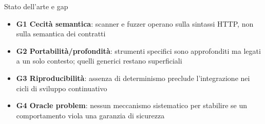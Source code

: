 
\begin{frame}{Stato dell'arte e gap}
  \begin{itemize}
    \item \textbf{G1 Cecità semantica}: scanner e fuzzer operano sulla \alert{sintassi} HTTP, non sulla \alert{semantica} dei contratti

    \item \textbf{G2 Portabilità/profondità}: strumenti specifici sono \alert{approfonditi} ma legati a un \alert{solo contesto}; quelli generici restano \alert{superficiali}

    \item \textbf{G3 Riproducibilità}: assenza di \alert{determinismo} preclude l'integrazione nei cicli di \alert{sviluppo continuativo}

    \item \textbf{G4 Oracle problem}: nessun meccanismo sistematico per stabilire se un comportamento viola una \alert{garanzia di sicurezza}
  \end{itemize}
\end{frame}